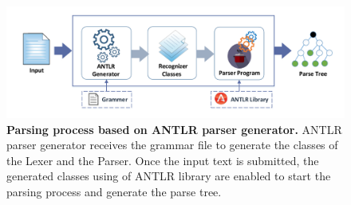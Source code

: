 \begin{figure}[ht]
	\begin{center}
		\includegraphics[scale=0.52]{images/ANTLR.pdf}
		\vspace{-2mm}
		\caption{\textbf{Parsing process based on ANTLR parser generator\cite{ANTLR:Tool:Online}.} 
		ANTLR parser generator receives the grammar file to generate the classes of the Lexer and the Parser.
		Once the input text is submitted, the generated classes using of ANTLR library are enabled to start the parsing process and generate the parse tree.}
		\label{Fig:ANTLR}
	\end{center}
\end{figure}
\vspace{-5mm}
